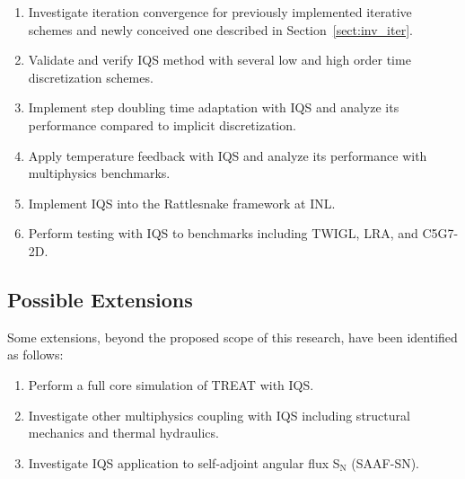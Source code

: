 \documentclass[12pt]{scrartcl}
\newcommand{\sct}[1]{Section~\ref{#1}}                   %
\begin{document}
\begin{enumerate}[topsep=0pt,itemsep=-1ex,partopsep=1ex,parsep=1ex]
\item Investigate iteration convergence for previously implemented iterative schemes and newly conceived one described in \sct{sect:inv_iter}.
\item Validate and verify IQS method with several low and high order time discretization schemes.
\item Implement step doubling time adaptation with IQS and analyze its performance compared to implicit discretization.
\item Apply temperature feedback with IQS and analyze its performance with multiphysics benchmarks.
\item Implement IQS into the Rattlesnake framework at INL.
\item Perform testing with IQS to benchmarks including TWIGL, LRA, and C5G7-2D.
\end{enumerate}

\subsection{Possible Extensions}

Some extensions, beyond the proposed scope of this research, have been identified as follows:

\begin{enumerate}[topsep=0pt,itemsep=-1ex,partopsep=1ex,parsep=1ex]
\item Perform a full core simulation of TREAT with IQS.
\item Investigate other multiphysics coupling with IQS including structural mechanics and thermal hydraulics.
\item Investigate IQS application to self-adjoint angular flux S$_\text{N}$ (SAAF-SN).
\end{enumerate}

\newpage



\end{document}
